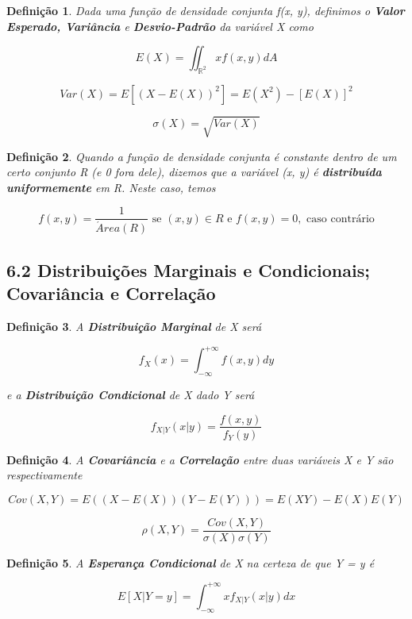 \documentclass[12pt]{article}
\newtheorem{definition}{Definição}
\begin{document}
\begin{definition}
    Dada uma função de densidade conjunta f(x, y), definimos o \textbf{Valor Esperado, Variância} e \textbf{Desvio-Padrão} da variável X como
    
    $$E(X) = \iint_{\mathbb{R}^2} x f(x, y) dA$$
    
    $$Var(X) = E \left [ (X - E(X))^2 \right ] = E(X^2) - [E(X)]^2$$
    
    $$\sigma(X) = \sqrt{Var(X)}$$
\end{definition}

\begin{definition}
    Quando a função de densidade conjunta é constante dentro de um certo conjunto R (e 0 fora dele), dizemos que a variável (x, y) é \textbf{distribuída uniformemente} em R. Neste caso, temos
    
    $$f(x, y) = \frac{1}{\acute{A}rea(R)} \text{ se } (x, y) \in R \text{ e } f(x, y) = 0, \text{ caso contrário}$$
\end{definition}

\subsection*{6.2 Distribuições Marginais e Condicionais; Covariância e Correlação}

\begin{definition}
    A \textbf{Distribuição Marginal} de X será
    
    $$f_X(x) = \int_{- \infty}^{+ \infty} f(x, y) d y$$
    
    e a \textbf{Distribuição Condicional} de X dado Y será
    
    $$f_{X | Y} (x | y) = \dfrac{f(x, y)}{f_Y(y)}$$
\end{definition}

\begin{definition}
    A \textbf{Covariância} e a \textbf{Correlação} entre duas variáveis X e Y são respectivamente 
    
    $$Cov(X, Y) = E((X - E(X))(Y - E(Y))) = E(XY) - E(X) E(Y)$$
    
    $$\rho(X, Y) = \dfrac{Cov(X, Y)}{\sigma(X) \sigma(Y)}$$
\end{definition}

\begin{definition}
    A \textbf{Esperança Condicional} de X na certeza de que Y = y é 
    
    $$E[X | Y = y] = \int_{- \infty}^{+ \infty} x f_{X | Y} (x | y) dx$$
\end{definition}
\end{document}
